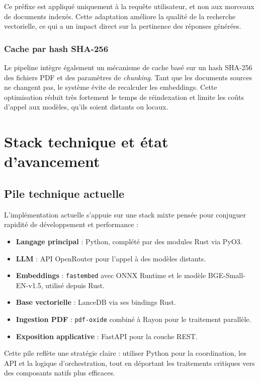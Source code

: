 \documentclass[12pt,a4paper]{report}
\begin{document}
Ce préfixe est appliqué uniquement à la requête utilisateur, et non aux morceaux de documents indexés. Cette adaptation améliore la qualité de la recherche vectorielle, ce qui a un impact direct sur la pertinence des réponses générées.

\subsection{Cache par hash SHA-256}

Le pipeline intègre également un mécanisme de cache basé sur un hash SHA-256 des fichiers PDF et des paramètres de \textit{chunking}. Tant que les documents sources ne changent pas, le système évite de recalculer les embeddings. Cette optimisation réduit très fortement le temps de réindexation et limite les coûts d'appel aux modèles, qu'ils soient distants ou locaux.

\chapter{Stack technique et état d'avancement}

\section{Pile technique actuelle}

L'implémentation actuelle s'appuie sur une stack mixte pensée pour conjuguer rapidité de développement et performance :

\begin{itemize}[leftmargin=1.2cm]
  \item \textbf{Langage principal} : Python, complété par des modules Rust via PyO3.
  \item \textbf{LLM} : API OpenRouter pour l'appel à des modèles distants.
  \item \textbf{Embeddings} : \texttt{fastembed} avec ONNX Runtime et le modèle BGE-Small-EN-v1.5, utilisé depuis Rust.
  \item \textbf{Base vectorielle} : LanceDB via ses bindings Rust.
  \item \textbf{Ingestion PDF} : \texttt{pdf-oxide} combiné à Rayon pour le traitement parallèle.
  \item \textbf{Exposition applicative} : FastAPI pour la couche REST.
\end{itemize}

Cette pile reflète une stratégie claire : utiliser Python pour la coordination, les API et la logique d'orchestration, tout en déportant les traitements critiques vers des composants natifs plus efficaces.
\end{document}
